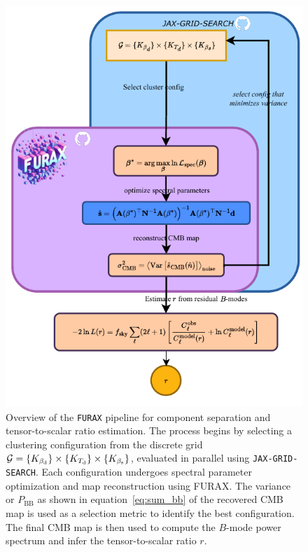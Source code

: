 \documentclass[fleqn,usenatbib]{mnras}
\begin{document}
\begin{figure}
    \centering
    \includegraphics[width=\linewidth]{figures/FURAX-CS.pdf}
    \caption{
        Overview of the \texttt{FURAX} pipeline for component separation and tensor-to-scalar ratio estimation. The process begins by selecting a clustering configuration from the discrete grid \( \mathcal{G} = \{K_{\beta_{\rm d}}\} \times \{K_{T_{\rm d}}\} \times \{K_{\beta_{\rm s}}\} \), evaluated in parallel using \texttt{JAX-GRID-SEARCH}. Each configuration undergoes spectral parameter optimization and map reconstruction using \textsc{FURAX}. The variance or $P_{\mathrm{BB}}$ as shown in equation~\eqref{eq:sum_bb} of the recovered CMB map is used as a selection metric to identify the best configuration. The final CMB map is then used to compute the \( B \)-mode power spectrum and infer the tensor-to-scalar ratio \( r \). 
    }
    \label{fig:furax_pipeline}
\end{figure}
\end{document}
